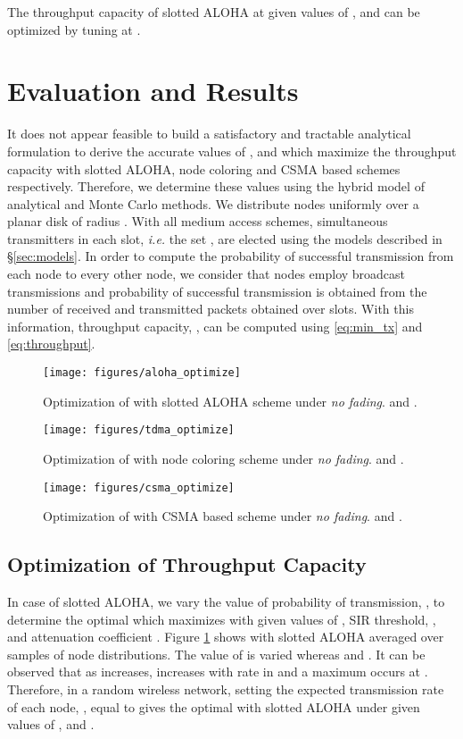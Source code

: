 \documentclass[12pt,english]{article}
\begin{document}
The throughput capacity of slotted ALOHA at given values of ,  and  can be optimized by tuning  at .

\section{Evaluation and Results}
\label{sec:simulations}

It does not appear feasible to build a satisfactory and tractable analytical formulation to derive the accurate values of ,  and  which maximize the throughput capacity with slotted ALOHA, node coloring and CSMA based schemes respectively. Therefore, we determine these values using the hybrid model of analytical and Monte Carlo methods. We distribute  nodes uniformly over a planar disk of radius . With all medium access schemes, simultaneous transmitters in each slot, {\it i.e.} the set , are elected using the models described in \S \ref{sec:models}. In order to compute the probability of successful transmission from each node to every other node, we consider that nodes employ broadcast transmissions and probability of successful transmission is obtained from the number of received and transmitted packets obtained over  slots. With this information, throughput capacity, , can be computed using \eqref{eq:min_tx} and \eqref{eq:throughput}.

\begin{figure}[!t]
\centering
\texttt{[image: figures/aloha\_optimize]}
\caption{Optimization of  with slotted ALOHA scheme under {\em no fading}.  and .
\label{fig:optimize_aloha}}
\end{figure}
\begin{figure}[!t]
\centering
\texttt{[image: figures/tdma\_optimize]}
\caption{Optimization of  with node coloring scheme under {\em no fading}.  and .
\label{fig:optimize_tdma}}
\end{figure}
\begin{figure}[!t]
\centering
\texttt{[image: figures/csma\_optimize]}
\caption{Optimization of  with CSMA based scheme under {\em no fading}.  and .
\label{fig:optimize_csma}}
\end{figure}

\subsection{Optimization of Throughput Capacity}

In case of slotted ALOHA, we vary the value of probability of transmission, , to determine the optimal  which maximizes  with given values of , SIR threshold, , and attenuation coefficient . Figure \ref{fig:optimize_aloha} shows  with slotted ALOHA averaged over  samples of node distributions. The value of  is varied whereas \mbox{} and \mbox{}. It can be observed that as  increases,  increases with rate in  and a maximum occurs at \mbox{}. Therefore, in a random wireless network, setting the expected transmission rate of each node, , equal to  gives the optimal  with slotted ALOHA under given values of ,  and . 
\end{document}
